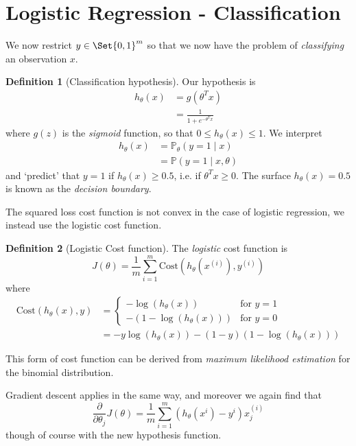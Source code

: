 \documentclass[a4paper,12pt]{article}
\theoremstyle{definition}
\newtheorem*{defn}{Definition}
\renewcommand{\Pr}{\mathbb{P}}
\providecommand\given{} %
\renewcommand{\given}{\mid}
\begin{document}
\section{Logistic Regression - Classification}
\label{logistic-regression}
We now restrict $y \in \Set{0, 1}^{m}$ so that we now have the problem of \emph{classifying} an observation $x$.

\begin{defn}[Classification hypothesis]
Our hypothesis is 
\begin{align*}
h_{\theta}(x) &= g(\theta^T x) \\
&= \frac{1}{1 + e^{-\theta^{T} x}}
\end{align*}
where $g(z)$ is the \emph{sigmoid} function, so that $0 \leq h_{\theta}(x) \leq 1$. We interpret
\begin{align*}
h_{\theta}(x) &= \Pr_{\theta}(y = 1 \given x) \\
&= \Pr(y = 1 \given x, \theta)
\end{align*}
and `predict' that $y = 1$ if $h_{\theta}(x) \ge 0.5$, i.e. if $\theta^{T} x \ge 0$. The surface $h_{\theta}(x) = 0.5$ is known as the \emph{decision boundary}.
\end{defn}

The squared loss cost function is not convex in the case of logistic regression, we instead use the logistic cost function. 
\begin{defn}[Logistic Cost function]
The \emph{logistic} cost function is
\[
J(\theta) = \frac{1}{m} \sum_{i=1}^{m} \mathrm{Cost}(h_{\theta}(x^{(i)}), y^{(i)})
\]
where
\begin{align*}
\mathrm{Cost}(h_{\theta}(x), y) & = 
\begin{cases}
-\log(h_{\theta}(x)) & \text{for } y = 1 \\
-(1 - \log(h_{\theta}(x))) & \text{for } y = 0
\end{cases} \\
& = - y \log(h_{\theta}(x)) - (1 - y)(1 - \log(h_{\theta}(x)))
\end{align*}
\end{defn}

This form of cost function can be derived from \emph{maximum likelihood estimation} for the binomial distribution.

Gradient descent applies in the same way, and moreover we again find that
\[
\frac{\partial}{\partial \theta_j} J(\theta) = \frac{1}{m} \sum_{i=1}^{m}{ \left( h_{\theta}(x^{i}) - y^{i}\right) x^{(i)}_j }
\]
though of course with the new hypothesis function.
\end{document}
